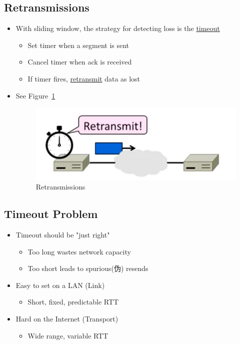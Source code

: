 \documentclass[12pt]{ctexart}   %
\begin{document}
	\subsection{Retransmissions}
	\begin{itemize}
		\item With sliding window, the strategy for detecting loss is the \underline{timeout}
		\begin{itemize}
			\item Set timer when a segment is sent
			\item Cancel timer when ack is received
			\item If timer fires, \underline{retransmit} data as lost
		\end{itemize}
		\item See Figure~\ref{fig:6-7-2}
		  
		 \begin{figure}[h!] %
		\centering
		 \includegraphics[scale=0.7]{images/6-7-2}
		\caption{ Retransmissions  }
		 \label{fig:6-7-2}
		 \end{figure}
	\end{itemize}
	
	\subsection{Timeout Problem}
	\begin{itemize}
		\item Timeout should be "just right"
		\begin{itemize}
			\item Too long wastes network capacity
			\item Too short leads to spurious(伪) resends
		\end{itemize}
		
		\item Easy to set on a LAN (Link)
		\begin{itemize}
			\item Short, fixed, predictable RTT
		\end{itemize}
		
		\item Hard on the Internet (Transport)
		\begin{itemize}
			\item Wide range, variable RTT
		\end{itemize}
	\end{itemize}
	
\end{document}
